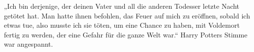 „Ich bin derjenige, der deinen Vater und all die anderen Todesser letzte Nacht getötet hat. Man hatte ihnen befohlen, das Feuer auf mich zu eröffnen, sobald ich etwas tue, also musste ich sie töten, um eine Chance zu haben, mit Voldemort fertig zu werden, der eine Gefahr für die ganze Welt war.“ Harry Potters Stimme war angespannt.
